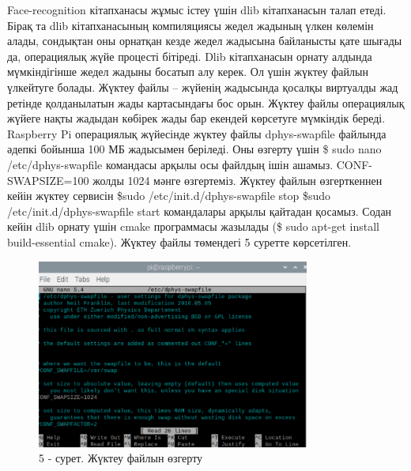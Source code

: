 Face-recognition кітапханасы жұмыс істеу үшін dlib кітапханасын талап
етеді. Бірақ та dlib кітапханасының компиляциясы жедел жадының үлкен
көлемін алады, сондықтан оны орнатқан кезде жедел жадысына байланысты
қате шығады да, операциялық жүйе процесті бітіреді. Dlib кітапханасын
орнату алдында мүмкіндігінше жедел жадыны босатып алу керек. Ол үшін
жүктеу файлын үлкейтуге болады. Жүктеу файлы -- жүйенің жадысында
қосалқы виртуалды жад ретінде қолданылатын жады картасындағы бос орын.
Жүктеу файлы операциялық жүйеге нақты жадыдан көбірек жады бар екендей
көрсетуге мүмкіндік береді. Raspberry Pi операциялық жүйесінде жүктеу
файлы dphys-swapfile файлында әдепкі бойынша 100 МБ жадысымен беріледі.
Оны өзгерту үшін \$ sudo nano /etc/dphys-swapfile командасы арқылы осы
файлдың ішін ашамыз. CONF-SWAPSIZE=100 жолды 1024 мәнге өзгертеміз.
Жүктеу файлын өзгерткеннен кейін жүктеу сервисін \$sudo
/etc/init.d/dphys-swapfile stop \$sudo /etc/init.d/dphys-swapfile start
командалары арқылы қайтадан қосамыз. Содан кейін dlib орнату үшін cmake
программасы жазылады (\$ sudo apt-get install build-essential cmake).
Жүктеу файлы төмендегі 5 суретте көрсетілген.

\begin{figure}[H]
	\centering
	\includegraphics[width=0.8\textwidth]{media/ict2/image164}
	\caption*{5 - сурет. Жүктеу файлын өзгерту}
\end{figure}

